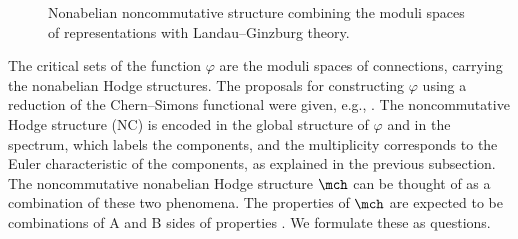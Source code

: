 \documentclass[pdftex]{sigma}
\begin{document}
\begin{figure}[ht]
	\centering
	\caption{Nonabelian noncommutative structure combining the moduli spaces of representations with Landau--Ginzburg theory.}
	\label{fig:NCNA}
\end{figure}

The critical sets of the function $\varphi$ are the moduli spaces of connections, carrying the nonabelian Hodge structures. The proposals for constructing $\varphi$ using a reduction of the Chern--Simons functional were given, e.g., \cite{EGGKPSS22,EGGKPS22}. The noncommutative Hodge structure (NC) is encoded in the global structure of $\varphi$ and in the spectrum, which labels the components, and the multiplicity corresponds to the Euler characteristic of the components, as explained in the previous subsection. The noncommutative nonabelian Hodge structure $\mch$ can be thought of as a combination of these two phenomena. The properties of $\mch$ are expected to be combinations of A and B sides of properties \cite{KKP08}. We formulate these as questions.

\end{document}
